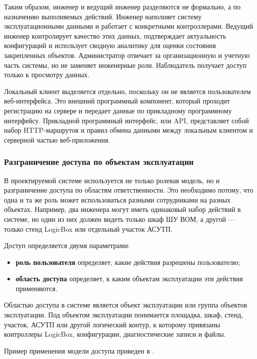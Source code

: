Таким образом, инженер и ведущий инженер разделяются не формально, а по назначению выполняемых действий. Инженер наполняет систему эксплуатационными данными и работает с конкретными контроллерами. Ведущий инженер контролирует качество этих данных, подтверждает актуальность конфигураций и использует сводную аналитику для оценки состояния закрепленных объектов. Администратор отвечает за организационную и учетную часть системы, но не заменяет инженерные роли. Наблюдатель получает доступ только к просмотру данных.

Локальный клиент выделяется отдельно, поскольку он не является пользователем веб-интерфейса. Это внешний программный компонент, который проходит регистрацию на сервере и передает данные по прикладному программному интерфейсу. Прикладной программный интерфейс, или API, представляет собой набор HTTP-маршрутов и правил обмена данными между локальным клиентом и серверной частью веб-приложения.

\subsubsection{Разграничение доступа по объектам эксплуатации}

В проектируемой системе используется не только ролевая модель, но и разграничение доступа по областям ответственности. Это необходимо потому, что одна и та же роль может использоваться разными сотрудниками на разных объектах. Например, два инженера могут иметь одинаковый набор действий в системе, но один из них должен видеть только шкаф ШУ ВОМ, а другой --- только стенд LogicBox или отдельный участок АСУТП.

Доступ определяется двумя параметрами:
\begin{itemize}
    \item \textbf{роль пользователя} определяет, какие действия разрешены пользователю;
    \item \textbf{область доступа} определяет, к каким объектам эксплуатации эти действия применяются.
\end{itemize}

Областью доступа в системе является объект эксплуатации или группа объектов эксплуатации. Под объектом эксплуатации понимается площадка, шкаф, стенд, участок, АСУТП или другой логический контур, к которому привязаны контроллеры LogicBox, конфигурации, диагностические записи и файлы.

Пример применения модели доступа приведен в .

